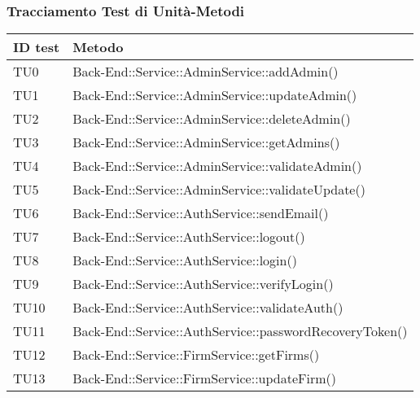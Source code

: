 \documentclass[../PianoDiQualifica_v3.0.0.tex]{subfiles}
\begin{document}
	\subsubsection{Tracciamento Test di Unità-Metodi}
	\begin{longtable}[c] { >{\centering\arraybackslash}p{} >{\centering\arraybackslash}p{}}
		\toprule
		\centerline{\textbf{ID test}} & \centerline{\textbf{Metodo}}  \\
			\midrule
			TU0 & Back-End::Service::AdminService::addAdmin() \\
			\addlinespace[0.3em]
			\midrule
			\addlinespace[0.3em]
			TU1 & Back-End::Service::AdminService::updateAdmin() \\
			\addlinespace[0.3em]
			\midrule
			\addlinespace[0.3em]
			TU2 & Back-End::Service::AdminService::deleteAdmin() \\
			\addlinespace[0.3em]
			\midrule
			\addlinespace[0.3em]
			TU3 & Back-End::Service::AdminService::getAdmins() \\
			\addlinespace[0.3em]
			\midrule
			\addlinespace[0.3em]
			TU4 & Back-End::Service::AdminService::validateAdmin() \\
			\addlinespace[0.3em]
			\midrule
			\addlinespace[0.3em]
			TU5 & Back-End::Service::AdminService::validateUpdate() \\
			\addlinespace[0.3em]
			\midrule
			\addlinespace[0.3em]
			TU6 & Back-End::Service::AuthService::sendEmail() \\
			\addlinespace[0.3em]
			\midrule
			\addlinespace[0.3em]
			TU7 & Back-End::Service::AuthService::logout() \\
			\addlinespace[0.3em]
			\midrule
			\addlinespace[0.3em]
			TU8 & Back-End::Service::AuthService::login() \\
			\addlinespace[0.3em]
			\midrule
			\addlinespace[0.3em]
			TU9 & Back-End::Service::AuthService::verifyLogin() \\
			\addlinespace[0.3em]
			\midrule
			\addlinespace[0.3em]
			TU10 & Back-End::Service::AuthService::validateAuth() \\
			\addlinespace[0.3em]
			\midrule
			\addlinespace[0.3em]
			TU11 & Back-End::Service::AuthService::passwordRecoveryToken() \\
			\addlinespace[0.3em]
			\midrule
			\addlinespace[0.3em]
			TU12 & Back-End::Service::FirmService::getFirms() \\
			\addlinespace[0.3em]
			\midrule
			\addlinespace[0.3em]
			TU13 & Back-End::Service::FirmService::updateFirm() \\

\end{longtable}
\end{document}
